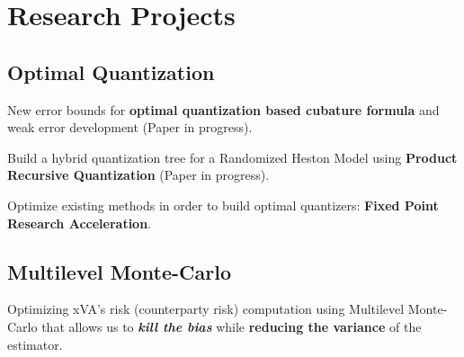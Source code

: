 \documentclass[]{deedy-resume-openfont}
\begin{document}
%
%
\lastupdated

%
%

%
%

\begin{minipage}[t]{0.33\textwidth} 



\section{Research Projects}

\subsection{Optimal Quantization}
\vspace{\topsep} %
\begin{tightemize}
\item New error bounds for \textbf{optimal quantization based cubature formula} and weak error development (Paper in progress).
\item Build a hybrid quantization tree for a Randomized Heston Model using \textbf{Product Recursive Quantization} (Paper in progress).
\item Optimize existing methods in order to build optimal quantizers: \textbf{Fixed Point Research Acceleration}. 
\end{tightemize}
\sectionsep
\subsection{Multilevel Monte-Carlo}
Optimizing xVA's risk (counterparty risk) computation using Multilevel Monte-Carlo that allows us to \textbf{\textit{kill the bias}} while \textbf{reducing the variance} of the estimator.




\end{minipage}
\end{document}
